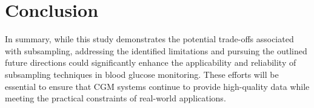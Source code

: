 
\section{Conclusion}
In summary, while this study demonstrates the potential trade-offs associated with subsampling, addressing the identified limitations and pursuing the outlined future directions could significantly enhance the applicability and reliability of subsampling techniques in blood glucose monitoring. These efforts will be essential to ensure that CGM systems continue to provide high-quality data while meeting the practical constraints of real-world applications.
 